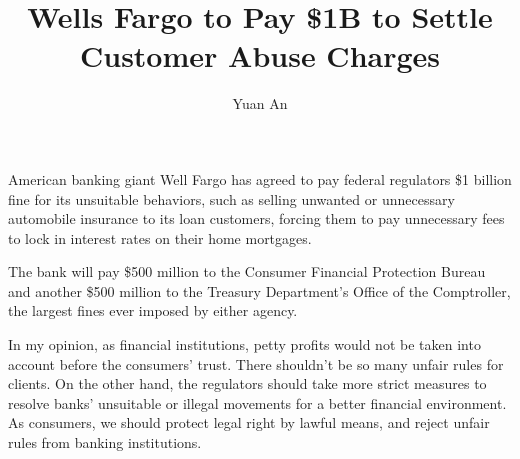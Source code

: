 \documentclass[a4paper,12pt]{article}
\title{Wells Fargo to Pay \$1B to Settle Customer Abuse Charges}
\author{Yuan An}
\begin{document}
\maketitle

American banking giant Well Fargo has agreed to pay federal regulators \$1 billion fine for its unsuitable behaviors, such as selling unwanted or unnecessary automobile insurance to its loan customers, forcing them to pay unnecessary fees to lock in interest rates on their home mortgages.
\par
The bank will pay \$500 million to the Consumer Financial Protection Bureau and another \$500 million to the Treasury Department's Office of the Comptroller, the largest fines ever imposed by either agency.
\par
In my opinion, as financial institutions, petty profits would not be taken into account before the consumers' trust. There shouldn't be so many unfair rules for clients. On the other hand, the regulators should take more strict measures to resolve banks' unsuitable or illegal movements for a better financial environment. As consumers, we should protect legal right by lawful means, and reject unfair rules from banking institutions.
\thispagestyle{empty}
\end{document}
